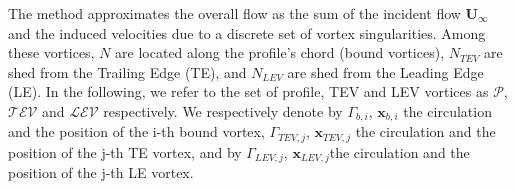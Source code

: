 \documentclass[a4paper,12pt]{article}
\begin{document}
The method approximates the overall flow as the sum of the incident flow $\textbf{U}_{\infty}$ and the induced velocities due to a discrete set of vortex singularities.
Among these vortices, $N$ are located along the profile's chord (bound vortices), $N_{TEV}$ are shed from the Trailing Edge (TE), and $N_{LEV}$ are shed from the Leading Edge (LE).
In the following, we refer to the set of profile, TEV and LEV vortices as $\mathcal{P}$, $\mathcal{TEV}$ and $\mathcal{LEV}$ respectively.
We respectively denote by $\Gamma_{b,i}$, $\textbf{x}_{b,i}$ the circulation and the position of the i-th bound vortex, $\Gamma_{TEV,j}$, $\textbf{x}_{TEV,j}$ the circulation and the position of the j-th TE vortex, and by $\Gamma_{LEV,j}$, $\textbf{x}_{LEV,j} $the circulation and the position of the j-th LE vortex.
\end{document}
